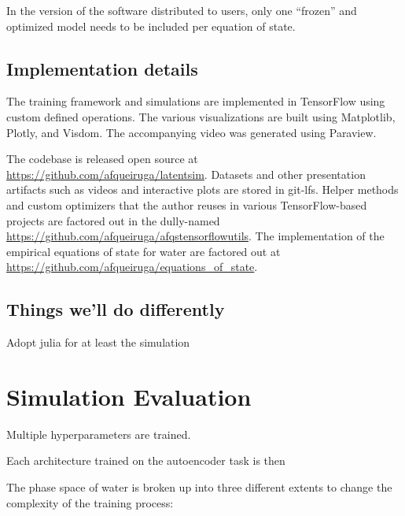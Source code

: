 \documentclass[AMA,STIX1COL]{WileyNJD-v2}
\begin{document}
In the version of the software distributed to users, only one
``frozen'' and optimized model needs to be included per equation of state.

\subsection{Implementation details}

The training framework and simulations are implemented in TensorFlow 
using custom defined operations. The various visualizations are built
using Matplotlib, Plotly, and Visdom. The accompanying video was
generated using Paraview.

The codebase is released open source at
\url{https://github.com/afqueiruga/latentsim}. Datasets and other
presentation artifacts such as videos and interactive plots are stored
in git-lfs. Helper methods and
custom optimizers that the
author reuses in various TensorFlow-based projects are factored out in
the dully-named \url{https://github.com/afqueiruga/afqstensorflowutils}.
The implementation of the empirical equations of state for water are
factored out at
\href{https://github.com/afqueiruga/equations_of_state}{https://github.com/afqueiruga/equations\_of\_state}.

\subsection{Things we'll do differently}

Adopt julia for at least the simulation



\hypertarget{header-n3359}{%
\section{Simulation Evaluation}\label{header-n3359}}

Multiple hyperparameters are trained.

Each architecture trained on the autoencoder task is then

The phase space of water is broken up into three different extents to
change the complexity of the training process:
\end{document}
